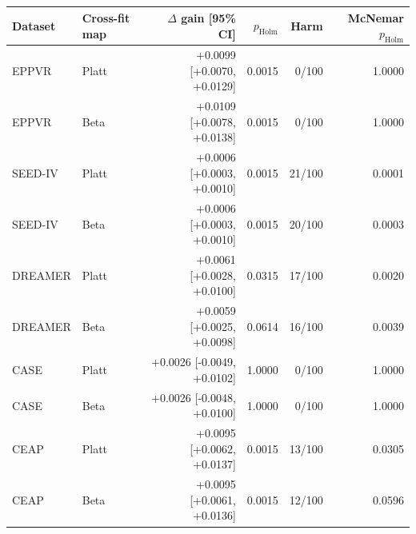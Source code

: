 \begin{tabular}{llrrrr}
\toprule
Dataset & Cross-fit map & $\Delta$ gain [95\% CI] & $p_{\mathrm{Holm}}$ & Harm & McNemar $p_{\mathrm{Holm}}$ \\
\midrule
EPPVR & Platt & +0.0099 [+0.0070, +0.0129] & 0.0015 & 0/100 & 1.0000 \\
EPPVR & Beta & +0.0109 [+0.0078, +0.0138] & 0.0015 & 0/100 & 1.0000 \\
SEED-IV & Platt & +0.0006 [+0.0003, +0.0010] & 0.0015 & 21/100 & 0.0001 \\
SEED-IV & Beta & +0.0006 [+0.0003, +0.0010] & 0.0015 & 20/100 & 0.0003 \\
DREAMER & Platt & +0.0061 [+0.0028, +0.0100] & 0.0315 & 17/100 & 0.0020 \\
DREAMER & Beta & +0.0059 [+0.0025, +0.0098] & 0.0614 & 16/100 & 0.0039 \\
CASE & Platt & +0.0026 [-0.0049, +0.0102] & 1.0000 & 0/100 & 1.0000 \\
CASE & Beta & +0.0026 [-0.0048, +0.0100] & 1.0000 & 0/100 & 1.0000 \\
CEAP & Platt & +0.0095 [+0.0062, +0.0137] & 0.0015 & 13/100 & 0.0305 \\
CEAP & Beta & +0.0095 [+0.0061, +0.0136] & 0.0015 & 12/100 & 0.0596 \\
\bottomrule
\end{tabular}
